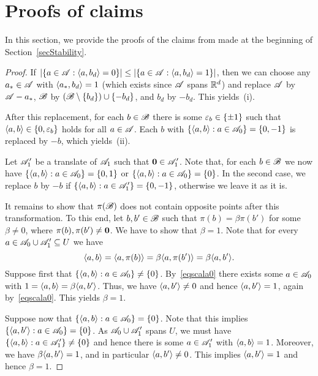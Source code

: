 \section{Proofs of claims}
\label{secClaims}

In this section, we provide the proofs of the claims from \cite{kupavskii22} made at the beginning of Section~\ref{secStability}. 

\claimassumptions*
\begin{proof}
    If $|\{ a \in {\mathscr{A}} : \langle a, b_d\rangle = 0\}| \le |\{ a \in {\mathscr{A}} : \langle a, b_d\rangle = 1\}|$, then we can choose any $a_* \in {\mathscr{A}}$ with $\langle a_*, b_d\rangle = 1$ (which exists since ${\mathscr{A}}$ spans ${\mathbb{R}}^d$) and replace ${\mathscr{A}}$ by ${\mathscr{A}} - a_*$, ${\mathscr{B}}$ by $({\mathscr{B}} \setminus \{b_d\}) \cup \{-b_d\}$, and $b_d$ by $-b_d$.
    This yields~(i).

    After this replacement, for each $b \in {\mathscr{B}}$ there is some ${\varepsilon}_b \in \{\pm 1\}$ such that $\langle a, b\rangle \in \{0,{\varepsilon}_b\}$ holds for all $a \in {\mathscr{A}}$.
    Each $b$ with $\{\langle a,b\rangle : a \in {\mathscr{A}}_0\} = \{0,-1\}$ is replaced by $-b$, which yields~(ii).

    Let ${\mathscr{A}}_1'$ be a translate of ${\mathscr{A}}_1$ such that $\mathbf{0} \in {\mathscr{A}}_1'$.
    Note that, for each $b \in {\mathscr{B}}$ we now have $\{\langle a,b\rangle : a \in {\mathscr{A}}_0\} = \{0,1\}$ or $\{\langle a,b\rangle : a \in {\mathscr{A}}_0\} = \{0\}$.
    In the second case, we replace $b$ by $-b$ if $\{\langle a,b\rangle : a \in {\mathscr{A}}_1'\} = \{0,-1\}$, otherwise we leave it as it is.

    It remains to show that $\pi({\mathscr{B}})$ does not contain opposite points after this transformation.
    To this end, let $b,b' \in {\mathscr{B}}$ such that $\pi(b) = \beta \pi(b')$ for some $\beta \ne 0$, where $\pi(b),\pi(b') \ne \mathbf{0}$.
    We have to show that $\beta = 1$.
    Note that for every $a \in {\mathscr{A}}_0 \cup {\mathscr{A}}_1' \subseteq U$ we have
    \[
        \langle a,b\rangle = \langle a, \pi(b)\rangle = \beta \langle a, \pi(b')\rangle = \beta \langle a,b'\rangle.
    \]
    Suppose first that $\{\langle a,b\rangle : a \in {\mathscr{A}}_0\} \ne \{0\}$.
    By~\eqref{eqscala0} there exists some $a \in {\mathscr{A}}_0$ with $1 = \langle a,b\rangle = \beta \langle a,b'\rangle$.
    Thus, we have $\langle a,b'\rangle \ne 0$ and hence $\langle a,b'\rangle = 1$, again by~\eqref{eqscala0}.
    This yields $\beta = 1$.

    Suppose now that $\{\langle a,b\rangle : a \in {\mathscr{A}}_0\} = \{0\}$.
    Note that this implies $\{\langle a,b'\rangle : a \in {\mathscr{A}}_0\} = \{0\}$.
    As ${\mathscr{A}}_0 \cup {\mathscr{A}}_1'$ spans $U$, we must have $ \{\langle a,b\rangle : a \in {\mathscr{A}}_1'\} \ne \{0\}$ and hence there is some $a \in {\mathscr{A}}_1'$ with $\langle a,b\rangle = 1$.
    Moreover, we have $\beta \langle a,b'\rangle = 1$, and in particular $\langle a,b'\rangle \ne 0$.
    This implies $\langle a,b'\rangle = 1$ and hence $\beta = 1$.
\end{proof}

